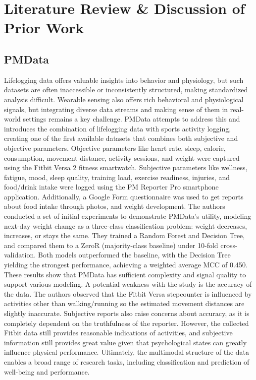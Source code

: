 \documentclass[12pt,letterpaper]{article}
\begin{document}
\section{Literature Review \& Discussion of Prior Work}

\subsection{PMData}
Lifelogging data offers valuable insights into behavior and physiology, but such datasets are often inaccessible or inconsistently structured, making standardized analysis difficult. Wearable sensing also offers rich behavioral and physiological signals, but integrating diverse data streams and making sense of them in real-world settings remains a key challenge. PMData \citep{thambawita2020pmdata} attempts to address this and introduces the combination of lifelogging data with sports activity logging, creating one of the first available datasets that combines both subjective and objective parameters. Objective parameters like heart rate, sleep, calorie, consumption, movement distance, activity sessions, and weight were captured using the Fitbit Versa 2 fitness smartwatch. Subjective parameters like wellness, fatigue, mood, sleep quality, training load, exercise readiness, injuries, and food/drink intake were logged using the PM Reporter Pro smartphone application. Additionally, a Google Form questionnaire was used to get reports about food intake through photos, and weight development. The authors conducted a set of initial experiments to demonstrate PMData’s utility, modeling next-day weight change as a three-class classification problem: weight decreases, increases, or stays the same. They trained a Random Forest and Decision Tree, and compared them to a ZeroR (majority-class baseline) under 10-fold cross-validation. Both models outperformed the baseline, with the Decision Tree yielding the strongest performance, achieving a weighted average MCC of 0.450. These results show that PMData has sufficient complexity and signal quality to support various modeling. A potential weakness with the study is the accuracy of the data. The authors observed that the Fitbit Versa stepcounter is influenced by activities other than walking/running so the estimated movement distances are slightly inaccurate. Subjective reports also raise concerns about accuracy, as it is completely dependent on the truthfulness of the reporter. However, the collected Fitbit data still provides reasonable indications of activities, and subjective information still provides great value given that psychological states can greatly influence physical performance. Ultimately, the multimodal structure of the data enables a broad range of research tasks, including classification and prediction of well-being and performance.
\end{document}
